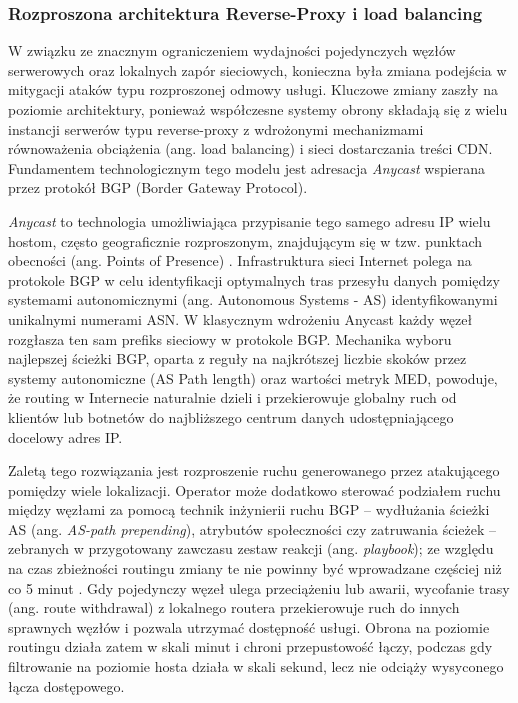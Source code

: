 \documentclass[a4paper,12pt]{article}
\begin{document}
\subsubsection{Rozproszona architektura Reverse-Proxy i load balancing}
W związku ze znacznym ograniczeniem wydajności pojedynczych węzłów serwerowych oraz lokalnych zapór sieciowych, konieczna była zmiana podejścia w mitygacji ataków typu rozproszonej odmowy usługi. Kluczowe zmiany zaszły na poziomie architektury, ponieważ współczesne systemy obrony składają się z wielu instancji serwerów typu reverse-proxy z wdrożonymi mechanizmami równoważenia obciążenia (ang. load balancing) i sieci dostarczania treści CDN. Fundamentem technologicznym tego modelu jest adresacja \textit{Anycast} wspierana przez protokół BGP (Border Gateway Protocol).

\textit{Anycast} to technologia umożliwiająca przypisanie tego samego adresu IP wielu hostom, często geograficznie rozproszonym, znajdującym się w tzw. punktach obecności (ang. Points of Presence) \cite{rfc4786}. Infrastruktura sieci Internet polega na protokole BGP w celu identyfikacji optymalnych tras przesyłu danych pomiędzy systemami autonomicznymi (ang. Autonomous Systems - AS) identyfikowanymi unikalnymi numerami ASN. W klasycznym wdrożeniu Anycast każdy węzeł rozgłasza ten sam prefiks sieciowy w protokole BGP. Mechanika wyboru najlepszej ścieżki BGP, oparta z reguły na najkrótszej liczbie skoków przez systemy autonomiczne (AS Path length) oraz wartości metryk MED, powoduje, że routing w Internecie naturalnie dzieli i przekierowuje globalny ruch od klientów lub botnetów do najbliższego centrum danych udostępniającego docelowy adres IP.

Zaletą tego rozwiązania jest rozproszenie ruchu generowanego przez atakującego pomiędzy wiele lokalizacji. Operator może dodatkowo sterować podziałem ruchu między węzłami za pomocą technik inżynierii ruchu BGP -- wydłużania ścieżki AS (ang. \textit{AS-path prepending}), atrybutów społeczności czy zatruwania ścieżek -- zebranych w przygotowany zawczasu zestaw reakcji (ang. \textit{playbook}); ze względu na czas zbieżności routingu zmiany te nie powinny być wprowadzane częściej niż co 5 minut \cite{rizvi2022anycast}. Gdy pojedynczy węzeł ulega przeciążeniu lub awarii, wycofanie trasy (ang. route withdrawal) z lokalnego routera przekierowuje ruch do innych sprawnych węzłów i pozwala utrzymać dostępność usługi. Obrona na poziomie routingu działa zatem w skali minut i chroni przepustowość łączy, podczas gdy filtrowanie na poziomie hosta działa w skali sekund, lecz nie odciąży wysyconego łącza dostępowego.
\end{document}
